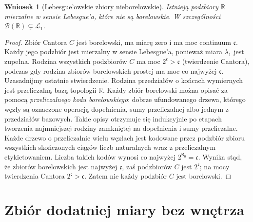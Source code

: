 \documentclass[11pt,a4paper,oneside]{book}
\numberwithin{equation}{chapter}
\theoremstyle{plain}
\newtheorem{wniosek}[twierdzenie]{Wniosek}
\theoremstyle{definition}
\theoremstyle{remark}
\begin{document}
\begin{wniosek}[Lebesgue'owskie zbiory nieborelowskie]
\label{cor:nonborel-lebesgue}
Istnieją podzbiory $\mathbb R$ mierzalne w sensie
Lebesgue'a, które nie są borelowskie. W szczególności
$\mathcal B(\mathbb R)\subsetneq\mathcal L_1$.
\end{wniosek}

\begin{proof}
Zbiór Cantora $C$ jest borelowski, ma miarę zero
i ma moc continuum $\mathfrak c$.
Każdy jego podzbiór jest mierzalny w sensie Lebesgue'a,
ponieważ miara $\lambda_1$ jest zupełna.
Rodzina wszystkich podzbiorów $C$ ma moc
$2^{\mathfrak c}>\mathfrak c$ (twierdzenie Cantora),
podczas gdy rodzina zbiorów borelowskich prostej ma
moc co najwyżej $\mathfrak c$. Uzasadnijmy ostatnie
stwierdzenie. Rodzina przedziałów o końcach wymiernych
jest przeliczalną bazą topologii $\mathbb R$. Każdy
zbiór borelowski można opisać za pomocą
\emph{przeliczalnego kodu borelowskiego}: dobrze
ufundowanego drzewa, którego węzły są oznaczone
operacją dopełnienia, sumy przeliczalnej albo
jednym z przedziałów bazowych. Takie opisy otrzymuje
się indukcyjnie po etapach tworzenia najmniejszej
rodziny zamkniętej na dopełnienia i sumy przeliczalne.
Każde drzewo o przeliczalnie wielu węzłach jest
kodowane przez podzbiór zbioru wszystkich skończonych
ciągów liczb naturalnych wraz z przeliczalnym
etykietowaniem. Liczba takich kodów wynosi co najwyżej
$2^{\aleph_0}=\mathfrak c$. Wynika stąd, że zbiorów
borelowskich jest najwyżej $\mathfrak c$, zaś
podzbiorów $C$ jest $2^{\mathfrak c}$; na mocy
twierdzenia Cantora $2^{\mathfrak c}>\mathfrak c$.
Zatem nie każdy podzbiór $C$ jest borelowski.
\end{proof}

\section{Zbiór dodatniej miary bez wnętrza}
\end{document}
